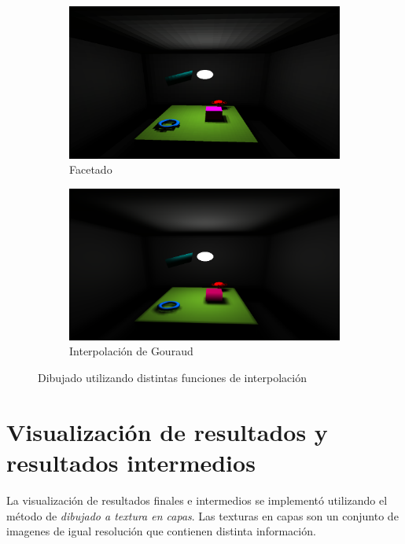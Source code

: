 \begin{figure}[htbp!]
	\centering
	\begin{subfigure}{0.7\textwidth}
		\centering
		\includegraphics[width=1\linewidth]{assets/cornell-flat}
		\caption{Facetado}
	\end{subfigure}
	\begin{subfigure}{0.7\textwidth}
		\centering
		\includegraphics[width=1\linewidth]{assets/cornell-gouraud}
		\caption{Interpolación de Gouraud}
	\end{subfigure}
	\caption{Dibujado utilizando distintas funciones de interpolación}
	\label{img:interpolationres}
\end{figure}

\section {Visualización de resultados y resultados intermedios}

La visualización de resultados finales e intermedios se implementó utilizando el método de \textit{dibujado a textura en capas}. Las texturas en capas son un conjunto de imagenes de igual resolución que contienen distinta información.

